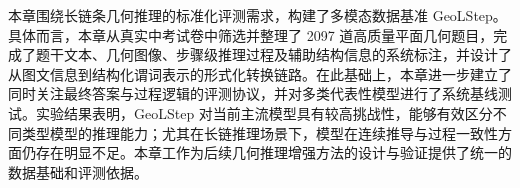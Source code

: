 
本章围绕长链条几何推理的标准化评测需求，构建了多模态数据基准 GeoLStep。具体而言，本章从真实中考试卷中筛选并整理了 2097 道高质量平面几何题目，完成了题干文本、几何图像、步骤级推理过程及辅助结构信息的系统标注，并设计了从图文信息到结构化谓词表示的形式化转换链路。在此基础上，本章进一步建立了同时关注最终答案与过程逻辑的评测协议，并对多类代表性模型进行了系统基线测试。实验结果表明，GeoLStep 对当前主流模型具有较高挑战性，能够有效区分不同类型模型的推理能力；尤其在长链推理场景下，模型在连续推导与过程一致性方面仍存在明显不足。本章工作为后续几何推理增强方法的设计与验证提供了统一的数据基础和评测依据。